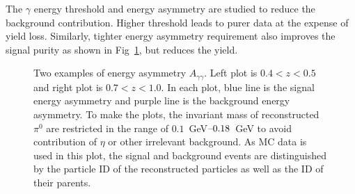 The $\gamma$ energy threshold and energy asymmetry are studied to reduce the background contribution. Higher threshold leads to purer data at the expense of yield loss. Similarly, tighter energy asymmetry requirement also improves the signal purity as shown in Fig~\ref{fig:photon_asymmetry}, but reduces the yield.
\begin{figure}[H]
\centering
  \caption{Two examples of energy asymmetry $A_{\gamma\gamma}$. Left plot is $0.4<z<0.5$ and right plot is $0.7<z<1.0$. In each plot, blue line is the signal energy asymmetry and purple line is the background energy asymmetry. To make the plots, the invariant mass of reconstructed $\pi^0$ are restricted in the range of $0.1$~GeV$\textup{--}0.18$~GeV to avoid contribution of $\eta$ or other irrelevant background. As MC data is used in this plot, the signal and background events are distinguished by the particle ID of the reconstructed particles as well as the ID of their parents.}
\label{fig:photon_asymmetry}
\end{figure}

